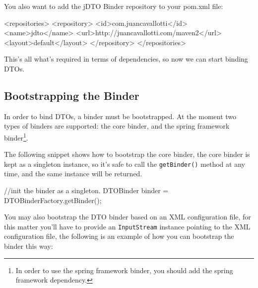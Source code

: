 \documentclass[11pt]{article}
\newcommand{\JDTO}{jDTO Binder\xspace}
\begin{document}

You also want to add the \JDTO repository to your pom.xml file:

\begin{xml}
     <repositories>
        <repository>
            <id>com.juancavallotti</id>
            <name>jdto</name>
            <url>http://juancavallotti.com/maven2</url>
            <layout>default</layout>
        </repository>
    </repositories>
\end{xml}

This's all what's required in terms of dependencies, so now we can start binding DTOs.

\subsection{Bootstrapping the Binder}


In order to bind DTOs, a binder must be bootstrapped. At the moment two types of binders
are supported: the core binder, and the spring framework binder\footnote{In order to use the spring framework binder, you should add the spring framework dependency.}.


The following snippet shows how to bootstrap the core binder, the core binder is kept as a singleton instance, so it's safe to call the \texttt{getBinder()} method at any time, and the same instance will be returned.


\begin{java}
//init the binder as a singleton.
DTOBinder binder = DTOBinderFactory.getBinder();
\end{java}

You may also bootstrap the DTO binder based on an XML configuration file, for this matter you'll have to provide an \texttt{InputStream} instance pointing to the XML configuration file, the following is an example of how you can bootstrap the binder this way:
\end{document}

